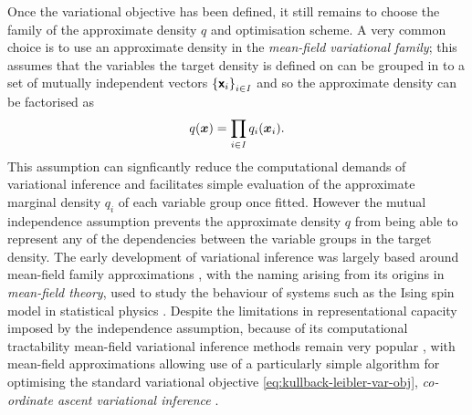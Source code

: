 Once the variational objective has been defined, it still remains to choose the family of the approximate density $q$ and optimisation scheme. 
A very common choice is to use an approximate density in the \emph{mean-field variational family}; this assumes that the variables the target density is defined on can be grouped in to a set of mutually independent vectors $\fset{\rvct{x}_i}_{i\in\set{I}}$ and so the approximate density can be factorised as
\begin{equation}\label{eq:mean-field-variational-family}
  q(\boldsymbol{x}) = \prod_{i\in\mathit{I}} q_i(\boldsymbol{x}_i).
\end{equation}
This assumption can signficantly reduce the computational demands of variational inference and facilitates simple evaluation of the approximate marginal density $q_{i}$ of each variable group once fitted. However the mutual independence assumption prevents the approximate density $q$ from being able to represent any of the dependencies between the variable groups in the target density. The early development of variational inference was largely based around mean-field family approximations \citep{peterson1987mean,saul1996mean}, with the naming arising from its origins in \emph{mean-field theory}, used to study the behaviour of systems such as the Ising spin model in statistical physics \citep{parisi1998statistical}. Despite the limitations in representational capacity imposed by the independence assumption, because of its computational tractability mean-field variational inference methods remain very popular \citep{blei2017variational}, with mean-field approximations allowing use of a particularly simple algorithm for optimising the standard variational objective \eqref{eq:kullback-leibler-var-obj}, \emph{co-ordinate ascent variational inference} \citep{bishop2006pattern,blei2017variational}.

